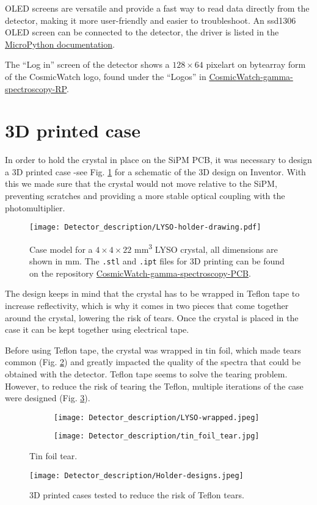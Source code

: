 OLED screens are versatile and provide a fast way to read data directly from the detector, making it more user-friendly and easier to troubleshoot. An ssd1306 OLED screen can be connected to the detector, the driver is listed in the \href{https://github.com/micropython/micropython-lib/tree/master/micropython/drivers/display}{MicroPython documentation}.

The ``Log in'' screen of the detector shows a $128\times 64$ pixelart on bytearray form of the CosmicWatch logo, found under the ``Logos'' in \href{https://github.com/anvargasl/CosmicWatch-gamma-spectroscopy-RP}{CosmicWatch-gamma-spectroscopy-RP}.

\section{3D printed case}

In order to hold the crystal in place on the SiPM PCB, it was necessary to design a 3D printed case -see Fig. \ref{fig:3d_case_desing} for a schematic of the 3D design on Inventor. With this we made sure that the crystal would not move relative to the SiPM, preventing scratches and providing a more stable optical coupling with the photomultiplier.

\begin{figure}[h]
    \centering
    \texttt{[image: Detector\_description/LYSO-holder-drawing.pdf]}
    \caption{Case model for a $4\times4\times22$ \unit{mm\cubed} LYSO crystal, all dimensions are shown in \unit{\mm}. The \texttt{.stl} and \texttt{.ipt} files for 3D printing can be found on the repository \href{https://github.com/anvargasl/CosmicWatch-gamma-spectroscopy-PCB}{CosmicWatch-gamma-spectroscopy-PCB}.}
    \label{fig:3d_case_desing}
\end{figure}

The design keeps in mind that the crystal has to be wrapped in Teflon tape to increase reflectivity, which is why it comes in two pieces that come together around the crystal, lowering the risk of tears. Once the crystal is placed in the case it can be kept together using electrical tape.

Before using Teflon tape, the crystal was wrapped in tin foil, which made tears common (Fig. \ref{fig:tin_foil_tear}) and greatly impacted the quality of the spectra that could be obtained with the detector. Teflon tape seems to solve the tearing problem. However, to reduce the risk of tearing the Teflon, multiple iterations of the case were designed (Fig. \ref{fig:3d_previous_desings}).
\begin{figure}
    \centering
    \begin{subfigure}[t]{0.35\textwidth}
      \texttt{[image: Detector\_description/LYSO-wrapped.jpeg]}
    \end{subfigure}
    \begin{subfigure}[t]{0.35\textwidth}
      \texttt{[image: Detector\_description/tin\_foil\_tear.jpg]}
    \end{subfigure}
    \caption{\label{fig:tin_foil_tear}Tin foil tear.}
\end{figure}

\begin{figure}
    \centering
    \texttt{[image: Detector\_description/Holder-designs.jpeg]}
    \caption{3D printed cases tested to reduce the risk of Teflon tears.}
    \label{fig:3d_previous_desings}
\end{figure}
